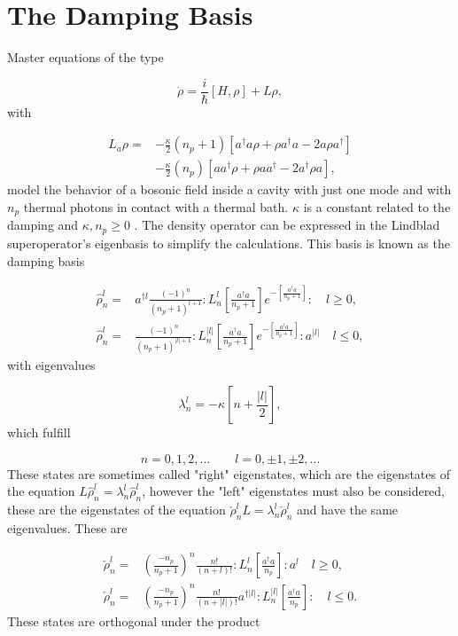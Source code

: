 \documentclass[reprint, amsmath,amssymb, aps,pra]{revtex4-1}
\begin{document}
\appendix
\section{The Damping Basis}\label{App1}

Master equations of the type 

\begin{equation}
\dot{\rho} = \frac{i}{\hbar}[H,\rho]+L\rho, 
\end{equation} with

\begin{align}\label{EMField}
L_a \rho =& - \frac{\kappa}{2}(n_p+1)[a^\dagger a\rho + \rho a^\dagger a -2a\rho a^\dagger] \nonumber \\
 &- \frac{\kappa}{2}(n_p)[ aa^\dagger\rho + \rho  aa^\dagger -2a^\dagger\rho a],
\end{align} model the behavior of a bosonic field inside a cavity with just one mode and with $n_p$ thermal photons in contact with a thermal bath. $\kappa$ is a constant related to the damping and $\kappa,n_p \geq 0$  \cite{EnglertDB}. The density operator can be expressed in the Lindblad superoperator's eigenbasis to simplify the calculations. This basis is known as the damping basis \cite{EnglertDB}

\begin{align}\label{DefDB}
\hat{\rho}_n^l=&a^{\dagger l}\frac{(-1)^n}{(n_p+1)^{l+1}}:L_n^l[\frac{a^\dagger a}{n_p+1}]e^{-[\frac{a^\dagger a}{n_p+1}]}:\quad l \geq 0, \\
\hat{\rho}_n^l=&\frac{(-1)^n}{(n_p+1)^{|l|+1}}:L_n^{|l|}[\frac{a^\dagger a}{n_p+1}]e^{-[\frac{a^\dagger a}{n_p+1}]}:a^{|l|}\quad l \leq 0,
\end{align} with eigenvalues

\begin{equation}
\lambda_n^l = -\kappa[n + \frac{|l|}{2}],
\end{equation} which fulfill

\begin{equation}
n=0,1,2,...\qquad l = 0,\pm 1, \pm 2,... 
\end{equation} These states are sometimes called "right" eigenstates, which are the eigenstates of the equation $L\hat{\rho}_n^l = \lambda_n^l\hat{\rho}_n^l$, however the "left" eigenstates must also be considered, these are the eigenstates of the equation $\check{\rho}_n^lL = \lambda_n^l\check{\rho}_n^l$ and have the same eigenvalues. These are

\begin{align}\label{DefDBDual}
\check{\rho}_n^l=&(\frac{-n_p}{n_p+1})^n\frac{n!}{(n+l)!}:L_n^l[\frac{a^\dagger a}{n_p}]:a^{l}\quad l \geq 0, \\
\check{\rho}_n^l=&(\frac{-n_p}{n_p+1})^n\frac{n!}{(n+|l|)!}a^{\dagger|l|}:L_n^{|l|}[\frac{a^\dagger a}{n_p}]:\quad l \leq 0.
\end{align} These states are orthogonal under the product
\end{document}
